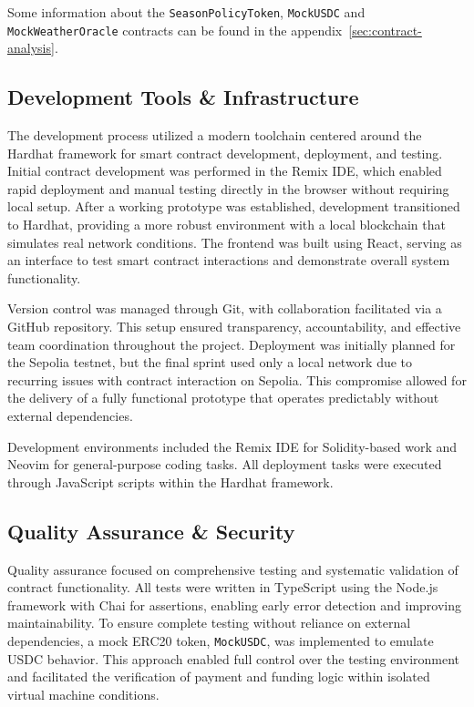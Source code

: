 \documentclass[11pt,a4paper]{article}
\begin{document}
		Some information about the \texttt{SeasonPolicyToken}, \texttt{MockUSDC} and \texttt{MockWeatherOracle} contracts can be found in the appendix~\ref{sec:contract-analysis}.


        \subsection{Development Tools \& Infrastructure}\label{subsec:development-tools-infrastructure}
		The development process utilized a modern toolchain centered around the Hardhat framework for smart contract development, deployment, and testing. 
		Initial contract development was performed in the Remix IDE, which enabled rapid deployment and manual testing directly in the browser without requiring local setup. 
		After a working prototype was established, development transitioned to Hardhat, providing a more robust environment with a local blockchain that simulates real network conditions. 
		The frontend was built using React, serving as an interface to test smart contract interactions and demonstrate overall system functionality. 

		Version control was managed through Git, with collaboration facilitated via a GitHub repository. This setup ensured transparency, accountability, and effective team coordination throughout the project. 
		Deployment was initially planned for the Sepolia testnet, but the final sprint used only a local network due to recurring issues with contract interaction on Sepolia. 
		This compromise allowed for the delivery of a fully functional prototype that operates predictably without external dependencies. 

		Development environments included the Remix IDE for Solidity-based work and Neovim for general-purpose coding tasks. 
		All deployment tasks were executed through JavaScript scripts within the Hardhat framework. 

		\subsection{Quality Assurance \& Security}\label{subsec:qa-security}
		Quality assurance focused on comprehensive testing and systematic validation of contract functionality. 
		All tests were written in TypeScript using the Node.js framework with Chai for assertions, enabling early error detection and improving maintainability. 
		To ensure complete testing without reliance on external dependencies, a mock ERC20 token, \texttt{MockUSDC}, was implemented to emulate USDC behavior. 
		This approach enabled full control over the testing environment and facilitated the verification of payment and funding logic within isolated virtual machine conditions. 
\end{document}
